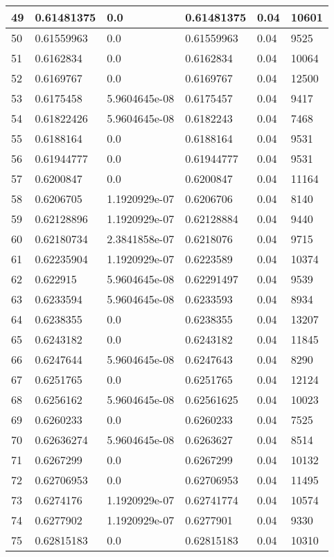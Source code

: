 \begin{longtable}{|l|l|l|l|l|l|}
49 & 0.61481375 & 0.0 & 0.61481375 & 0.04 & 10601 \\ \hline 
50 & 0.61559963 & 0.0 & 0.61559963 & 0.04 & 9525 \\ \hline 
51 & 0.6162834 & 0.0 & 0.6162834 & 0.04 & 10064 \\ \hline 
52 & 0.6169767 & 0.0 & 0.6169767 & 0.04 & 12500 \\ \hline 
53 & 0.6175458 & 5.9604645e-08 & 0.6175457 & 0.04 & 9417 \\ \hline 
54 & 0.61822426 & 5.9604645e-08 & 0.6182243 & 0.04 & 7468 \\ \hline 
55 & 0.6188164 & 0.0 & 0.6188164 & 0.04 & 9531 \\ \hline 
56 & 0.61944777 & 0.0 & 0.61944777 & 0.04 & 9531 \\ \hline 
57 & 0.6200847 & 0.0 & 0.6200847 & 0.04 & 11164 \\ \hline 
58 & 0.6206705 & 1.1920929e-07 & 0.6206706 & 0.04 & 8140 \\ \hline 
59 & 0.62128896 & 1.1920929e-07 & 0.62128884 & 0.04 & 9440 \\ \hline 
60 & 0.62180734 & 2.3841858e-07 & 0.6218076 & 0.04 & 9715 \\ \hline 
61 & 0.62235904 & 1.1920929e-07 & 0.6223589 & 0.04 & 10374 \\ \hline 
62 & 0.622915 & 5.9604645e-08 & 0.62291497 & 0.04 & 9539 \\ \hline 
63 & 0.6233594 & 5.9604645e-08 & 0.6233593 & 0.04 & 8934 \\ \hline 
64 & 0.6238355 & 0.0 & 0.6238355 & 0.04 & 13207 \\ \hline 
65 & 0.6243182 & 0.0 & 0.6243182 & 0.04 & 11845 \\ \hline 
66 & 0.6247644 & 5.9604645e-08 & 0.6247643 & 0.04 & 8290 \\ \hline 
67 & 0.6251765 & 0.0 & 0.6251765 & 0.04 & 12124 \\ \hline 
68 & 0.6256162 & 5.9604645e-08 & 0.62561625 & 0.04 & 10023 \\ \hline 
69 & 0.6260233 & 0.0 & 0.6260233 & 0.04 & 7525 \\ \hline 
70 & 0.62636274 & 5.9604645e-08 & 0.6263627 & 0.04 & 8514 \\ \hline 
71 & 0.6267299 & 0.0 & 0.6267299 & 0.04 & 10132 \\ \hline 
72 & 0.62706953 & 0.0 & 0.62706953 & 0.04 & 11495 \\ \hline 
73 & 0.6274176 & 1.1920929e-07 & 0.62741774 & 0.04 & 10574 \\ \hline 
74 & 0.6277902 & 1.1920929e-07 & 0.6277901 & 0.04 & 9330 \\ \hline 
75 & 0.62815183 & 0.0 & 0.62815183 & 0.04 & 10310 \\ \hline 
\end{longtable}